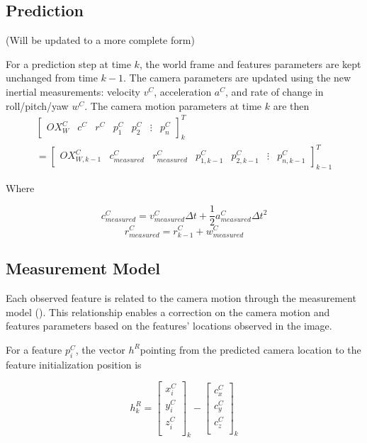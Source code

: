 \subsection{Prediction} (Will be updated to a more complete form)

For a prediction step at time $k$, the world frame and features
parameters are kept unchanged from time $k-1$. The camera parameters
are updated using the new inertial measurements: velocity $v^{C}$,
acceleration $a^{C}$, and rate of change in roll/pitch/yaw $w^{C}$.
The camera motion parameters at time $k$ are then
\begin{multline}
\begin{bmatrix}
OX_{W}^{C} & c^{C} & r^{C} & p_{1}^{C}& p_{2}^{C} & \vdots & p_n^C
\end{bmatrix}_{k}^T \\
=\begin{bmatrix}
OX_{W,k-1}^{C} & c_{measured}^{C} & r_{measured}^{C} & p_{1,k-1}^{C} &
p_{2,k-1}^{C} & \vdots & p_{n,k-1}^C
\end{bmatrix}_{k-1}^T
\end{multline}

Where 

$$c_{measured}^{C}=v_{measured}^{C}\Delta t+ \frac{1}{2}a_{measured}^{C}\Delta t^{2}$$
$$r_{measured}^{C}=r_{k-1}^{C}+ w_{measured}^{C}$$

\subsection{Measurement Model}

Each observed feature is related to the camera motion through the 
measurement model (). This relationship enables a correction on the 
camera motion and features parameters based on the features' locations 
observed in the image. 

For a feature $p_{i}^{C}$, the vector $h^{R}$pointing from the 
predicted camera location to the feature initialization position is 

\begin{equation}
h_{k}^{R}=\begin{bmatrix}
x_{i}^{C} \\
y_{i}^{C} \\
z_{i}^{C} \\
\end{bmatrix}_{k}-\begin{bmatrix}
c_{x}^{C} \\
c_{y}^{C} \\
c_{z}^{C} \\
\end{bmatrix}_{k}
\end{equation}

